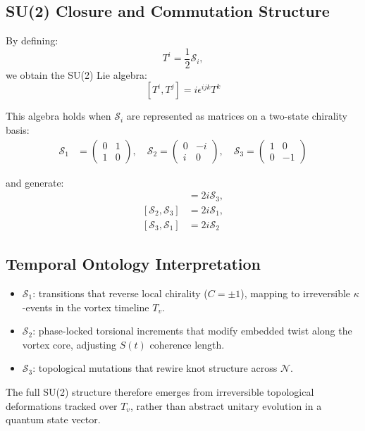 \subsection*{SU(2) Closure and Commutation Structure}

By defining:
\[
T^i = \frac{1}{2} \mathcal{S}_i,
\]
we obtain the SU(2) Lie algebra:
\[
[T^i, T^j] = i \epsilon^{ijk} T^k
\]

This algebra holds when \( \mathcal{S}_i \) are represented as matrices on a two-state chirality basis:
\begin{align}
\mathcal{S}_1 &= \begin{pmatrix} 0 & 1 \\ 1 & 0 \end{pmatrix}, \quad
\mathcal{S}_2 = \begin{pmatrix} 0 & -i \\ i & 0 \end{pmatrix}, \quad
\mathcal{S}_3 = \begin{pmatrix} 1 & 0 \\ 0 & -1 \end{pmatrix}
\end{align}

and generate:
\begin{align}
[\mathcal{S}_1, \mathcal{S}_2] &= 2i \mathcal{S}_3, \\
[\mathcal{S}_2, \mathcal{S}_3] &= 2i \mathcal{S}_1, \\
[\mathcal{S}_3, \mathcal{S}_1] &= 2i \mathcal{S}_2
\end{align}

\subsection*{Temporal Ontology Interpretation}

\begin{itemize}
  \item \( \mathcal{S}_1 \): transitions that reverse local chirality (\( C = \pm 1 \)), mapping to irreversible $\kappa$-events in the vortex timeline \( T_v \).
  \item \( \mathcal{S}_2 \): phase-locked torsional increments that modify embedded twist along the vortex core, adjusting $S(t)$ coherence length.
  \item \( \mathcal{S}_3 \): topological mutations that rewire knot structure across $\mathcal{N}$.
\end{itemize}

The full SU(2) structure therefore emerges from irreversible topological deformations tracked over \( T_v \), rather than abstract unitary evolution in a quantum state vector.

